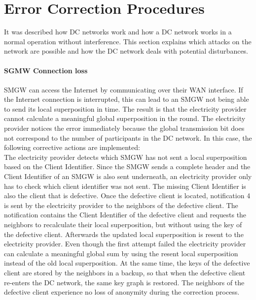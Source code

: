 \section{Error Correction Procedures}
\label{error_corr}
It was described how DC networks work and how a DC network works in a normal operation without interference. This section explains which attacks on the network are possible and how the DC network deals with potential disturbances.
\\
\\
\textbf{SGMW Connection loss}
\label{error_corr_conn}
\\
\\
SMGW can access the Internet by communicating over their WAN interface. If the Internet connection is interrupted, this can lead to an SMGW not being able to send its local superposition in time. The result is that the electricity provider cannot calculate a meaningful global superposition in the round. The electricity provider notices the error immediately because the global transmission bit does not correspond to the number of participants in the DC network. In this case, the following corrective actions are implemented:\\ %
The electricity provider detects which SMGW has not sent a local superposition based on the Client Identifier. Since the SMGW sends a complete header and the Client Identifier of an SMGW is also sent underneath, an electricity provider only has to check which client identifier was not sent. The missing Client Identifier is also the client that is defective. Once the defective client is located, notification 4 is sent by the electricity provider to the neighbors of the defective client. The notification contains the Client Identifier of the defective client and requests the neighbors to recalculate their local superposition, but without using the key of the defective client. Afterwards the updated local superposition is resent to the electricity provider. Even though the first attempt failed the electricity provider can calculate a meaningful global sum by using the resent local superposition instead of the old local superposition. At the same time, the keys of the defective client are stored by the neighbors in a backup, so that when the defective client re-enters the DC network, the same key graph is restored. The neighbors of the defective client experience no loss of anonymity during the correction process.\\%
